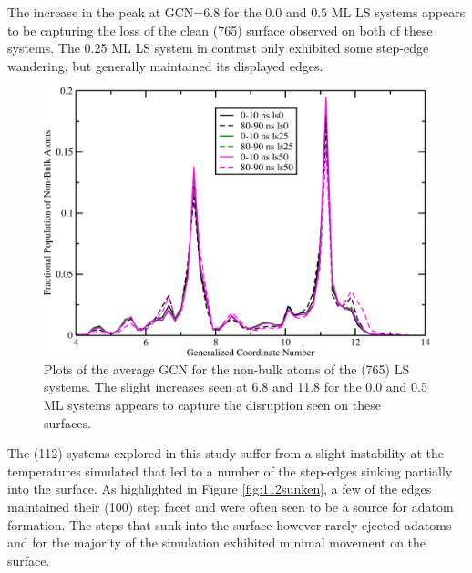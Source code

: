The increase in the peak at GCN=6.8 for the 0.0 and 0.5 ML LS systems appears
to be capturing the loss of the clean (765) surface observed on both of these
systems. The 0.25 ML LS system in contrast only exhibited some step-edge
wandering, but generally maintained its displayed edges.

\begin{figure}
\centering
\includegraphics[width=0.9\linewidth]{../figures/appB/765ls_GCNF.pdf}
\caption{Plots of the average GCN for the non-bulk atoms of the  (765)
LS systems. The slight increases seen at 6.8 and 11.8 for the 0.0 and 0.5 ML
systems appears to capture the disruption seen on these surfaces.}
\label{fig:765lsGCN}
\end{figure}
\newpage

The (112) systems explored in this study suffer from a slight instability at
the temperatures simulated that led to a number of the step-edges sinking
partially into the surface. As highlighted in Figure \ref{fig:112sunken}, a few
of the edges maintained their (100) step facet and were often seen to be a
source for adatom formation. The steps that sunk into the surface however
rarely ejected adatoms and for the majority of the simulation exhibited
minimal movement on the surface.

